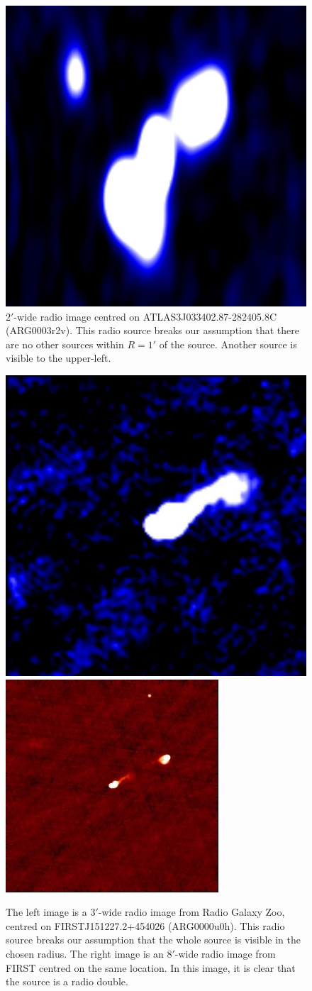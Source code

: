 \documentclass[fleqn,usenatbib,usedcolumn]{mnras}
\begin{document}
    \begin{figure}
      \centering
      \includegraphics[width=0.5\linewidth]{images/ARG0003r2v_radio.png}
      \caption{$2'$-wide radio image centred on ATLAS3\textunderscore{}J033402.87-282405.8C
        (ARG0003r2v). This radio source breaks our assumption that there are
        no other sources within $R = 1'$ of the source. Another source is
        visible to the upper-left.}
      \label{fig:broken-isolation}
    \end{figure}

    \begin{figure}
      \centering
      \includegraphics[width=0.45\linewidth]{images/ARG0000u0h_radio.jpg}
      \includegraphics[width=0.45\linewidth]{images/ARG0000u0h_first.jpg}
      \caption{The left image is a $3'$-wide radio image from Radio Galaxy
        Zoo, centred on FIRSTJ151227.2+454026 (ARG0000u0h). This radio source
        breaks our assumption that the whole source is visible in the chosen
        radius. The right image is an $8'$-wide radio image from FIRST centred
        on the same location. In this image, it is clear that the source is a
        radio double.}
      \label{fig:broken-contains}
    \end{figure}
\end{document}
